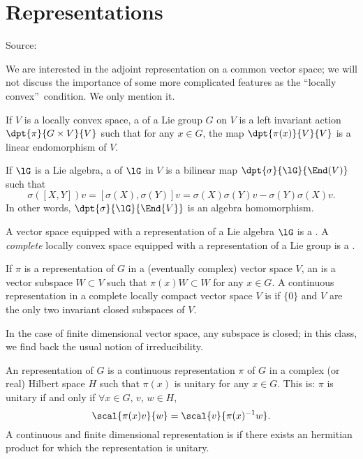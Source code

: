 \section{Representations}
Source: \cite{Lie_groups}

We are interested in the adjoint representation on a common vector space; we will not discuss the importance of some more complicated features as the ``locally convex''\ condition. We only mention it.

\begin{definition}
If $V$ is a locally convex space, a  of a Lie group $G$ on $V$ is a left invariant action $\dpt{\pi}{G\times V}{V}$ such that for any $x\in G$, the map $\dpt{\pi(x)}{V}{V}$ is a linear endomorphism of $V$.
\end{definition}

If $\lG$ is a Lie algebra, a  of $\lG$ in $V$ is a bilinear map $\dpt{\sigma}{\lG}{\End(V)}$ such that 
\begin{equation}
    \sigma([X,Y])v=[\sigma(X),\sigma(Y)]v=\sigma(X)\sigma(Y)v-\sigma(Y)\sigma(X)v.
\end{equation}
In other words, $\dpt{\sigma}{\lG}{\End{V}}$ is an algebra homomorphism.

A vector space equipped with a representation of a Lie algebra $\lG$ is a . A \emph{complete} locally convex space equipped with a representation of a Lie group is a . 

If $\pi$ is a representation of $G$ in a (eventually complex) vector space $V$, an  is a vector subspace $W\subset V$ such that $\pi(x)W\subset W$ for any $x\in G$. A continuous representation in a complete locally compact vector space $V$ is  if $\{0\}$ and $V$ are the only two invariant closed subspaces of $V$.

In the case of finite dimensional vector space, any subspace is closed; in this class, we find back the usual notion of irreducibility.

An  representation of $G$ is a continuous representation $\pi$ of $G$ in a complex (or real) Hilbert space $H$ such that $\pi(x)$ is unitary for any $x\in G$. This is: $\pi$ is unitary if and only if $\forall x\in G$, $v$, $w\in H$,
\begin{equation}
\scal{\pi(x)v}{w}=\scal{v}{\pi(x)^{-1} w}.
\end{equation}
A continuous and finite dimensional representation is  if there exists an hermitian product for which the representation is unitary.

